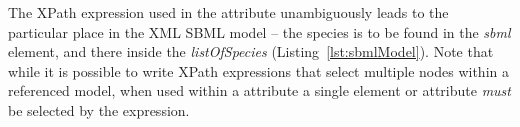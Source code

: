 The XPath expression used in the  attribute unambiguously leads to the particular place in the XML SBML model -- the species is to be found in the \emph{sbml} element, and there inside the \emph{listOfSpecies} (Listing~\vref{lst:sbmlModel}).
Note that while it is possible to write XPath expressions that select multiple nodes within a referenced model, when used within a  attribute a single element or attribute \emph{must} be selected by the expression.

